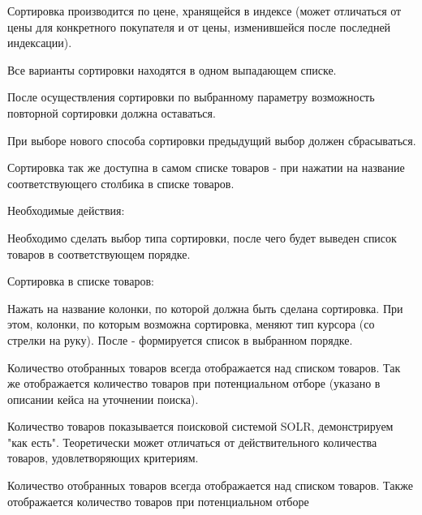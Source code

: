 {\begin{itogolong}
Сортировка производится по цене, хранящейся в индексе (может отличаться от цены для конкретного покупателя и от цены, изменившейся после последней индексации).

Все варианты сортировки находятся в одном выпадающем списке.

После осуществления сортировки по выбранному параметру возможность повторной сортировки должна оставаться.

При выборе нового способа сортировки предыдущий выбор должен сбрасываться.

Сортировка так же доступна в самом списке товаров - при нажатии на название соответствующего столбика в списке товаров.

Необходимые действия:

Необходимо сделать выбор типа сортировки, после чего будет выведен список товаров в соответствующем порядке.

Сортировка в списке товаров:

Нажать на название колонки, по которой должна быть сделана сортировка. При этом, колонки, по которым возможна сортировка, меняют тип курсора (со стрелки на руку). После - формируется список в выбранном порядке.

\end{itogolong}

}




{


\begin{wiki}
Количество отобранных товаров всегда отображается над списком товаров.
Так же отображается количество товаров при потенциальном отборе (указано в описании кейса на уточнении поиска).
\end{wiki}

\begin{teamidea}
Количество товаров показывается поисковой системой SOLR, демонстрируем "как есть". Теоретически может отличаться от действительного количества товаров, удовлетворяющих критериям.
\end{teamidea}


\begin{itogo}
Количество отобранных товаров всегда отображается над списком товаров. Также отображается количество товаров при потенциальном отборе
\end{itogo}



}



